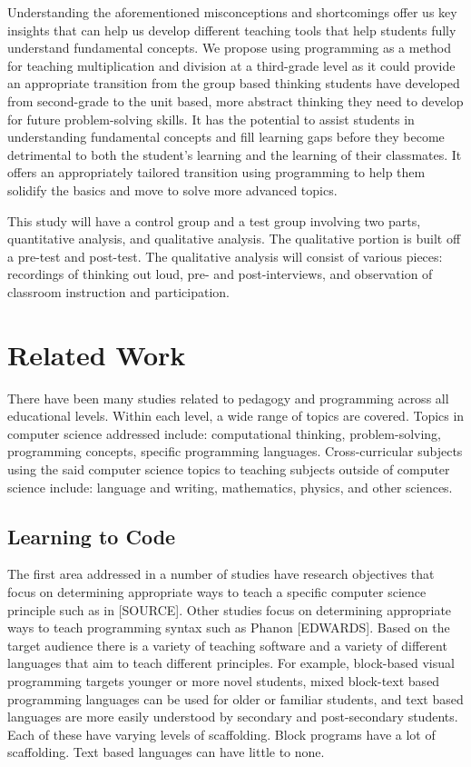 \documentclass[12pt]{extarticle}
\begin{document}
Understanding the aforementioned misconceptions and shortcomings offer us key insights that can help us develop different teaching tools that help students fully understand fundamental concepts. We propose using programming as a method for teaching multiplication and division at a third-grade level as it could provide an appropriate transition from the group based thinking students have developed from second-grade to the unit based, more abstract thinking they need to develop for future problem-solving skills. It has the potential to assist students in understanding fundamental concepts and fill learning gaps before they become detrimental to both the student’s learning and the learning of their classmates.  It offers an appropriately tailored transition using programming to help them solidify the basics and move to solve more advanced topics.

This study will have a control group and a test group involving two parts, quantitative analysis, and qualitative analysis. The qualitative portion is built off a pre-test and post-test. The qualitative analysis will consist of various pieces: recordings of thinking out loud, pre- and post-interviews, and observation of classroom instruction and participation.  

\section*{Related Work}

There have been many studies related to pedagogy and programming across all educational levels. Within each level, a wide range of topics are covered. Topics in computer science addressed include: computational thinking, problem-solving, programming concepts, specific programming languages. Cross-curricular subjects using the said computer science topics to teaching subjects outside of computer science include: language and writing, mathematics, physics, and other sciences.

\subsection*{Learning to Code}
The first area addressed in a number of studies have research objectives that focus on determining appropriate ways to teach a specific computer science principle such as in [SOURCE]. Other studies focus on determining appropriate ways to teach programming syntax such as Phanon [EDWARDS]. Based on the target audience there is a variety of teaching software and a variety of different languages that aim to teach different principles. For example, block-based visual programming targets younger or more novel students, mixed block-text based programming languages can be used for older or familiar students, and text based languages are more easily understood by secondary and post-secondary students. Each of these have varying levels of scaffolding. Block programs have a lot of scaffolding. Text based languages can have little to none.   
\end{document}
